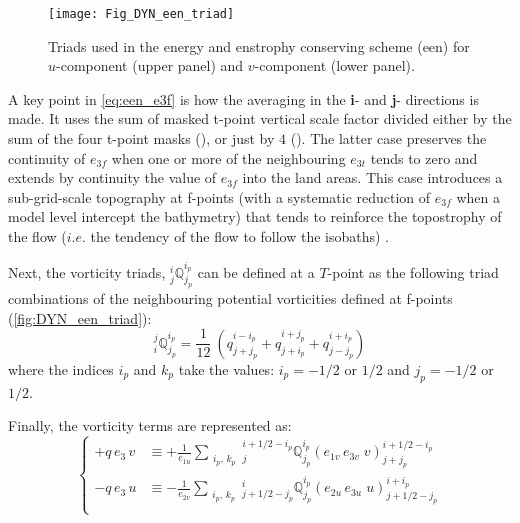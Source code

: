 \documentclass[../tex_main/NEMO_manual]{subfiles}
\begin{document}
\begin{figure}[!ht]    \begin{center}
\texttt{[image: Fig\_DYN\_een\_triad]}
\caption{ \protect\label{fig:DYN_een_triad}
  Triads used in the energy and enstrophy conserving scheme (een) for
  $u$-component (upper panel) and $v$-component (lower panel).}
\end{center}   \end{figure}

A key point in \autoref{eq:een_e3f} is how the averaging in the \textbf{i}- and \textbf{j}- directions is made. 
It uses the sum of masked t-point vertical scale factor divided either by the sum of the four t-point masks
(), or just by $4$ ().
The latter case preserves the continuity of $e_{3f}$ when one or more of the neighbouring $e_{3t}$ tends to zero and
extends by continuity the value of $e_{3f}$ into the land areas.
This case introduces a sub-grid-scale topography at f-points
(with a systematic reduction of $e_{3f}$ when a model level intercept the bathymetry)
that tends to reinforce the topostrophy of the flow
($i.e.$ the tendency of the flow to follow the isobaths) \citep{Penduff_al_OS07}. 

Next, the vorticity triads, $ {^i_j}\mathbb{Q}^{i_p}_{j_p}$ can be defined at a $T$-point as
the following triad combinations of the neighbouring potential vorticities defined at f-points
(\autoref{fig:DYN_een_triad}): 
\begin{equation} \label{eq:Q_triads}
_i^j \mathbb{Q}^{i_p}_{j_p}
= \frac{1}{12} \ \left(   q^{i-i_p}_{j+j_p} + q^{i+j_p}_{j+i_p} + q^{i+i_p}_{j-j_p}  \right)
\end{equation}
where the indices $i_p$ and $k_p$ take the values: $i_p = -1/2$ or $1/2$ and $j_p = -1/2$ or $1/2$. 

Finally, the vorticity terms are represented as: 
\begin{equation} \label{eq:dynvor_een}
\left\{ {
\begin{aligned}
 +q\,e_3 \, v 	&\equiv +\frac{1}{e_{1u} }   \sum_{\substack{i_p,\,k_p}} 
                         {^{i+1/2-i_p}_j}  \mathbb{Q}^{i_p}_{j_p}  \left( e_{1v}\,e_{3v} \;v  \right)^{i+1/2-i_p}_{j+j_p}   \\
 - q\,e_3 \, u     &\equiv -\frac{1}{e_{2v} }    \sum_{\substack{i_p,\,k_p}} 
                         {^i_{j+1/2-j_p}}  \mathbb{Q}^{i_p}_{j_p}  \left( e_{2u}\,e_{3u} \;u  \right)^{i+i_p}_{j+1/2-j_p}   \\
\end{aligned} 
} \right.
\end{equation} 
\end{document}
